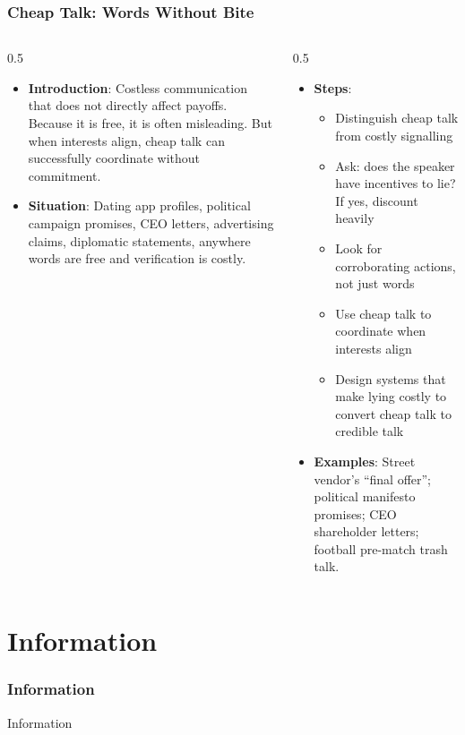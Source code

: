 \begin{frame}[fragile]\frametitle{Cheap Talk: Words Without Bite}
\begin{columns}
    \begin{column}[T]{0.5\linewidth}
      \begin{itemize}
        \item \textbf{Introduction}: Costless communication that does not directly affect payoffs. Because it is free, it is often misleading. But when interests align, cheap talk can successfully coordinate without commitment.
        \item \textbf{Situation}: Dating app profiles, political campaign promises, CEO letters, advertising claims, diplomatic statements, anywhere words are free and verification is costly.
      \end{itemize}
    \end{column}
    \begin{column}[T]{0.5\linewidth}
      \begin{itemize}
        \item \textbf{Steps}:
        \begin{itemize}
          \item Distinguish cheap talk from costly signalling
          \item Ask: does the speaker have incentives to lie? If yes, discount heavily
          \item Look for corroborating actions, not just words
          \item Use cheap talk to coordinate when interests align
          \item Design systems that make lying costly to convert cheap talk to credible talk
        \end{itemize}\item \textbf{Examples}: Street vendor's ``final offer''; political manifesto promises; CEO shareholder letters; football pre-match trash talk.
      \end{itemize}
    \end{column}
  \end{columns}
\end{frame}

\section{Information}

\begin{frame}[fragile]\frametitle{Information}
\begin{center}
{\Large Information}
\end{center}
\end{frame}


